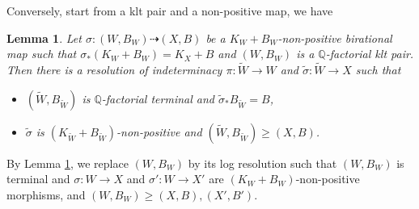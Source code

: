 \documentclass[11pt]{amsart}
\newtheorem{lem}[defn]{Lemma}
\begin{document}
Conversely, start from a klt pair and a non-positive map, we have
\begin{lem}\label{terminalresolution}
  \cite[Lemma 3.5]{liuSarkisovProgramGeneralized2021} Let $\sigma:(W,B_W)\dashrightarrow (X,B)$ be a $K_W+B_W$-non-positive birational map such that $\sigma_*(K_W+B_W)=K_X+B$ and $(W,B_W)$ is a $\mathbb{Q}$-factorial klt pair. Then there is a resolution of indeterminacy $\pi:\tilde{W}\to W $ and $\tilde{\sigma}:\tilde{W}\to X$ such that
\begin{itemize}
  \item $(\tilde{W},B_{\tilde{W}})$ is $\mathbb{Q}$-factorial terminal and $\tilde{\sigma}_*B_{\tilde{W}}=B$,
  \item $\tilde{\sigma}$ is $(K_{\tilde{W}}+B_{\tilde{W}})$-non-positive and $(\tilde{W},B_{\tilde{W}})\geqslant (X,B)$.
\end{itemize}
\end{lem}

By Lemma \ref{terminalresolution}, we  replace $(W,B_W)$ by its log resolution such that $(W,B_{W})$ is terminal and $\sigma:W\to X$ and $\sigma':W\to X'$ are $(K_W+B_W)$-non-positive morphisms, and $(W,B_W)\geqslant (X,B),(X',B')$. 
\end{document}
